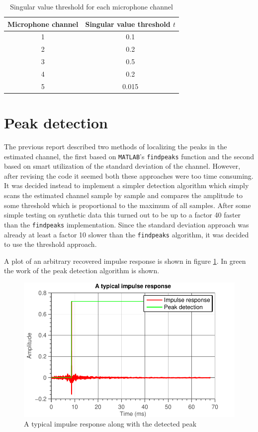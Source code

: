 \documentclass[11pt,titlepage]{report}
\begin{document}
\begin{table}[H]
\centering
\begin{tabular}{ c | c}
\hline \hline
Microphone channel & Singular value threshold $t$ \\
\hline
1 & \num{0.1} \\ 
2 & \num{0.2} \\
3 & \num{0.5} \\
4 & \num{0.2} \\
5 & \num{0.015} \\
\end{tabular}
\caption{Singular value threshold for each microphone channel}
\label{tab:loc_svd_value}
\end{table}

\section{Peak detection}
\label{sec:loc_peak}
The previous report \cite{epo4-del7} described two methods of localizing the peaks in the estimated channel, the first based on \texttt{MATLAB}'s \texttt{findpeaks} function and the second based on smart utilization of the standard deviation of the channel. However, after revising the code it seemed both these approaches were too time consuming. It was decided instead to implement a simpler detection algorithm which simply scans the estimated channel sample by sample and compares the amplitude to some threshold which is proportional to the maximum of all samples. After some simple testing on synthetic data this turned out to be up to a factor \num{40} faster than the \texttt{findpeaks} implementation. Since the standard deviation approach was already at least a factor \num{10} slower than the \texttt{findpeaks} algorithm, it was decided to use the threshold approach. 

A plot of an arbitrary recovered impulse response is shown in figure \ref{fig:localization-typical-impulse}. In green the work of the peak detection algorithm is shown. 

\begin{figure}[H]
	\centering
	\includegraphics[width=0.5\linewidth]{resource/typical-impulse.pdf}
	\caption{A typical impulse response along with the detected peak}
	\label{fig:localization-typical-impulse}
\end{figure}
\end{document}
